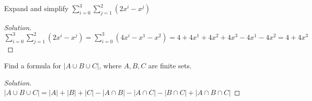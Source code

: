 \documentclass[crop=false,class=book]{standalone}
\begin{document}
\begin{problem}
Expand and simplify $\sum_{i=0}^{3}\sum_{j=1}^{2}(2x^i-x^j)$
\end{problem}
\begin{proof}[Solution]
\vspace{-0.5\topsep}
$\sum_{i=0}^{3}\sum_{j=1}^{2}(2x^i-x^j)=\sum_{i=0}^{3}(4x^{i}-x^{1}-x^{2})=4+4x^{1}+4x^{2}+4x^{3}-4x^{1}-4x^{2}=4+4x^3$
\end{proof}
\begin{problem}
Find a formula for $|A\cup B\cup C|$, where $A,B,C$ are finite sets.
\end{problem}
\begin{proof}[Solution]
\vspace{-0.5\topsep}
$|A\cup B\cup C| = |A|+|B|+|C|-|A\cap B|-|A\cap C|-|B\cap C| +|A\cap B \cap C|$
\end{proof}
\end{document}
